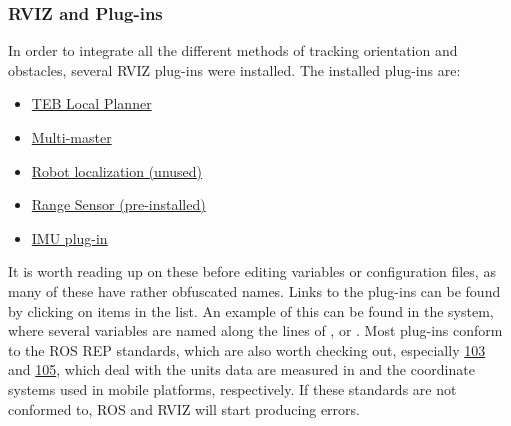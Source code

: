\subsubsection{RVIZ and Plug-ins}
In order to integrate all the different methods of tracking orientation and obstacles, several RVIZ plug-ins were installed.
The installed plug-ins are:
\begin{itemize}
\item \href{http://wiki.ros.org/teb_local_planner}{TEB Local Planner}
\item \href{http://wiki.ros.org/multimaster_fkie}{Multi-master}
\item \href{http://docs.ros.org/kinetic/api/robot_localization/html/index.html}{Robot localization (unused)}
\item \href{http://wiki.ros.org/range_sensor_layer}{Range Sensor (pre-installed)}
\item \href{http://wiki.ros.org/rviz_imu_plugin}{IMU plug-in}
\end{itemize}
It is worth reading up on these before editing variables or configuration files, as many of these have rather obfuscated names.
Links to the plug-ins can be found by clicking on items in the list.
An example of this can be found in the  system, where several variables are named along the lines of , or .
Most plug-ins conform to the ROS REP standards, which are also worth checking out, especially \href{https://www.ros.org/reps/rep-0103.html}{103}  and \href{https://www.ros.org/reps/rep-0105.html}{105}, which deal with the units data are measured in and the coordinate systems used in mobile platforms, respectively.
If these standards are not conformed to, ROS and RVIZ will start producing errors.


\newpage